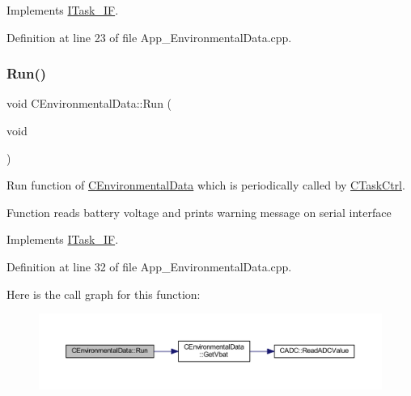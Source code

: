Implements \mbox{\hyperlink{class_i_task___i_f_a28f608bdb9b19658403f7b9b7421968d}{I\+Task\+\_\+\+IF}}.



Definition at line 23 of file App\+\_\+\+Environmental\+Data.\+cpp.

\mbox{\label{class_c_environmental_data_a586a729d3aab2873812517d950c91242}} 
\subsubsection{\texorpdfstring{Run()}{Run()}}
{\footnotesize\ttfamily void C\+Environmental\+Data\+::\+Run (\begin{DoxyParamCaption}\item[{void}]{ }\end{DoxyParamCaption})\hspace{0.3cm}{\ttfamily [virtual]}}



Run function of \mbox{\hyperlink{class_c_environmental_data}{C\+Environmental\+Data}} which is periodically called by \mbox{\hyperlink{class_c_task_ctrl}{C\+Task\+Ctrl}}. 

Function reads battery voltage and prints warning message on serial interface 

Implements \mbox{\hyperlink{class_i_task___i_f_ab73cc5879a61d00fc59b72cce32cc6f7}{I\+Task\+\_\+\+IF}}.



Definition at line 32 of file App\+\_\+\+Environmental\+Data.\+cpp.

Here is the call graph for this function\+:\nopagebreak
\begin{figure}[H]
\begin{center}
\leavevmode
\includegraphics[width=350pt]{class_c_environmental_data_a586a729d3aab2873812517d950c91242_cgraph}
\end{center}
\end{figure}
\mbox{\label{class_c_environmental_data_a61a8f487f013602aab4dadcf8a9da4c8}} 
